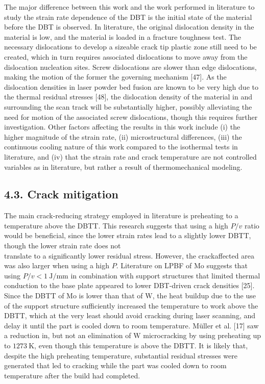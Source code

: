 \documentclass[10pt]{article}
\begin{document}
The major difference between this work and the work performed in literature to study the strain rate dependence of the DBT is the initial state of the material before the DBT is observed. In literature, the original dislocation density in the material is low, and the material is loaded in a fracture toughness test. The necessary dislocations to develop a sizeable crack tip plastic zone still need to be created, which in turn requires associated dislocations to move away from the dislocation nucleation sites. Screw dislocations are slower than edge dislocations, making the motion of the former the governing mechanism [47]. As the dislocation densities in laser powder bed fusion are known to be very high due to the thermal residual stresses [48], the dislocation density of the material in and surrounding the scan track will be substantially higher, possibly alleviating the need for motion of the associated screw dislocations, though this requires further investigation. Other factors affecting the results in this work include (i) the higher magnitude of the strain rate, (ii) microstructural differences, (iii) the continuous cooling nature of this work compared to the isothermal tests in literature, and (iv) that the strain rate and crack temperature are not controlled variables as in literature, but rather a result of thermomechanical modeling.

\subsection*{4.3. Crack mitigation}
The main crack-reducing strategy employed in literature is preheating to a temperature above the DBTT. This research suggests that using a high $P / v$ ratio would be beneficial, since the lower strain rates lead to a slightly lower DBTT, though the lower strain rate does not\\
translate to a significantly lower residual stress. However, the crackaffected area was also larger when using a high $P$. Literature on LPBF of Mo suggests that using $P / v<1 \mathrm{~J} / \mathrm{mm}$ in combination with support structures that limited thermal conduction to the base plate appeared to lower DBT-driven crack densities [25]. Since the DBTT of Mo is lower than that of $\mathrm{W}$, the heat buildup due to the use of the support structure sufficiently increased the temperature to work above the DBTT, which at the very least should avoid cracking during laser scanning, and delay it until the part is cooled down to room temperature. Müller et al. [17] saw a reduction in, but not an elimination of $\mathrm{W}$ microcracking by using preheating up to $1273 \mathrm{~K}$, even though this temperature is above the DBTT. It is likely that, despite the high preheating temperature, substantial residual stresses were generated that led to cracking while the part was cooled down to room temperature after the build had completed.
\end{document}
